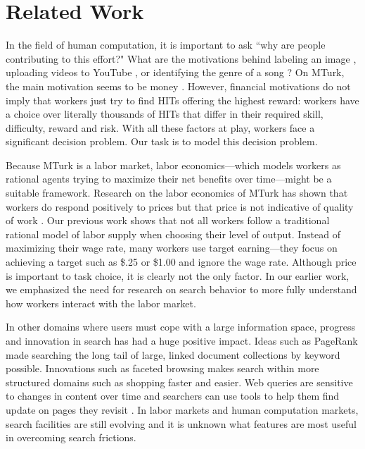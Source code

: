 \documentclass{acm_proc_article-sp}
\begin{document}
\section{Related Work} 
In the field of human computation, it is important to ask ``why are
people contributing to this effort?" What are the motivations behind
labeling an image \cite{von2004labeling}, uploading videos to YouTube
\cite{huberman-crowdsourcing}, or identifying the genre of a song
\cite{law2003tagatune}?  On MTurk, the main motivation seems to be
money \cite{ipeirotis2010,hortonZeck2010}. However, financial
motivations do not imply that workers just try to find HITs offering
the highest reward: workers have a choice over literally thousands of
HITs that differ in their required skill, difficulty, reward and
risk. With all these factors at play, workers face a significant
decision problem. Our task is to model this decision problem.


Because MTurk is a labor market, labor economics---which models
workers as rational agents trying to maximize their net benefits over
time---might be a suitable framework. Research on the labor economics
of MTurk has shown that workers do respond positively to prices but
that price is not indicative of quality of work
\cite{mason2009fip}. Our previous work \cite{horton2010labor} shows
that not all workers follow a traditional rational model of labor
supply when choosing their level of output.  Instead of maximizing
their wage rate, many workers use target earning---they focus on
achieving a target such as \$.25 or \$1.00 and ignore the wage rate.
Although price is important to task choice, it is clearly not the only
factor.  In our earlier work, we emphasized the need for research on
search behavior to more fully understand how workers interact with the
labor market.

In other domains where users must cope with a large information space,
progress and innovation in search has had a huge positive impact.
Ideas such as PageRank \cite{brin1998pagerank} made searching the long
tail of large, linked document collections by keyword possible.
Innovations such as faceted browsing \cite{hearst2002finding} makes
search within more structured domains such as shopping faster and
easier.   Web queries are sensitive to changes in content over time
and searchers can use tools to help them find update on pages they revisit
\cite{adar2008zoetrope}. In labor markets and human computation markets, search
facilities are still evolving and it is unknown what features are most
useful in overcoming search frictions.
\end{document}
